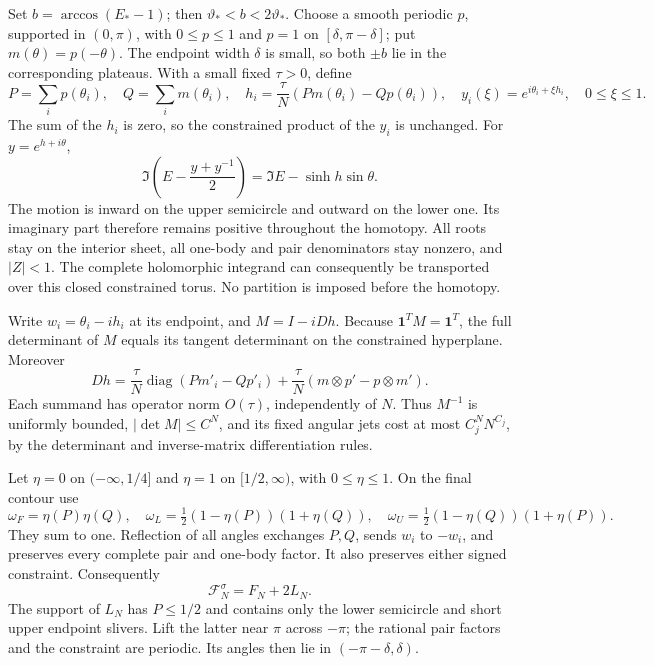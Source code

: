 \documentclass[11pt]{article}
\numberwithin{equation}{section}
\theoremstyle{definition}
\begin{document}
Set $b=\arccos({E}_*-1)$; then $\vartheta_*<b<2\vartheta_*$.
Choose a smooth periodic $p$, supported in $(0,\pi)$, with
$0\le p\le1$ and $p=1$ on $[\delta,\pi-\delta]$; put
$m(\theta)=p(-\theta)$.  The endpoint width $\delta$ is small,
so both $\pm b$ lie in the corresponding plateaus.  With a small
fixed $\tau>0$, define
\begin{equation}\label{eq:iso-balanced-deformation}
 P=\sum_i p(\theta_i),\quad Q=\sum_i m(\theta_i),\quad
 h_i=\frac\tau N(Pm(\theta_i)-Qp(\theta_i)),\quad
 y_i(\xi)=e^{i\theta_i+\xi h_i},\quad 0\le\xi\le1.
\end{equation}
The sum of the $h_i$ is zero, so the constrained product of the $y_i$
is unchanged.  For $y=e^{h+i\theta}$,
\[
 \Im\left({E}-\frac{y+y^{-1}}2\right)
       =\Im{E}-\sinh h\sin\theta.
\]
The motion is inward on the upper semicircle and outward on the lower
one.  Its imaginary part therefore remains positive throughout the
homotopy.  All roots stay on the interior sheet, all one-body and pair
denominators stay nonzero, and $|Z|<1$.  The complete holomorphic
integrand can consequently be transported over this closed constrained
torus.  No partition is imposed before the homotopy.

Write $w_i=\theta_i-ih_i$ at its endpoint, and $M=I-iDh$.
Because $\boldsymbol1^TM=\boldsymbol1^T$, the full determinant of $M$
equals its tangent determinant on the constrained hyperplane.  Moreover
\[
 Dh=\frac\tau N\operatorname{diag}(Pm'_i-Qp'_i)
       +\frac\tau N(m\otimes p'-p\otimes m').
\]
Each summand has operator norm $O(\tau)$, independently of $N$.
Thus $M^{-1}$ is uniformly bounded, $|\det M|\le C^N$, and its
fixed angular jets cost at most $C_j^NN^{C_j}$, by the determinant
and inverse-matrix differentiation rules.

Let $\eta=0$ on $(-\infty,1/4]$ and $\eta=1$ on $[1/2,\infty)$,
with $0\le\eta\le1$.  On the final contour use
\[
 \omega_F=\eta(P)\eta(Q),\quad
 \omega_L=\tfrac12(1-\eta(P))(1+\eta(Q)),\quad
 \omega_U=\tfrac12(1-\eta(Q))(1+\eta(P)).
\]
They sum to one.  Reflection of all angles exchanges $P,Q$, sends
$w_i$ to $-w_i$, and preserves every complete pair and one-body factor.
It also preserves either signed constraint.  Consequently
\begin{equation}\label{eq:iso-exact-split}
 \mathcal F_N^\sigma=F_N+2L_N.
\end{equation}
The support of $L_N$ has $P\le1/2$ and contains only the lower
semicircle and short upper endpoint slivers.  Lift the latter near
$\pi$ across $-\pi$; the rational pair factors and the constraint are
periodic.  Its angles then lie in $(-\pi-\delta,\delta)$.
\end{document}
